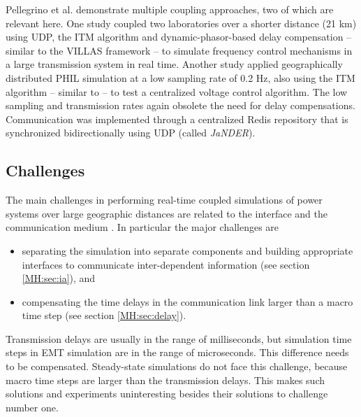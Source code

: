 \documentclass[a4paper]{atseminar}
\begin{document}

Pellegrino et al. \cite{strasser2019, pellegrino2020} demonstrate multiple coupling approaches, two of which are relevant here. One study coupled two laboratories over a shorter distance (21 km) using UDP, the ITM algorithm and dynamic-phasor-based delay compensation -- similar to the VILLAS framework -- to simulate frequency control mechanisms in a large transmission system in real time. Another study applied geographically distributed PHIL simulation at a low sampling rate of 0.2 Hz, also using the ITM algorithm -- similar to \cite{palmintier2015} -- to test a centralized voltage control algorithm. The low sampling and transmission rates again obsolete the need for delay compensations. Communication was implemented through a centralized Redis repository that is synchronized bidirectionally using UDP (called \textit{JaNDER}).

\subsection{Challenges}
\label{MH:sec:challenges}

The main challenges in performing real-time coupled simulations of power systems over large geographic distances are related to the interface and the communication medium \cite{montoya2020}. In particular the major challenges are

\begin{itemize}
    \item separating the simulation into separate components and building appropriate interfaces to communicate inter-dependent information (see section \ref{MH:sec:ia}), and
    \item compensating the time delays in the communication link larger than a macro time step (see section \ref{MH:sec:delay}).
\end{itemize}

Transmission delays are usually in the range of milliseconds, but simulation time steps in EMT simulation are in the range of microseconds. This difference needs to be compensated. Steady-state simulations do not face this challenge, because macro time steps are larger than the transmission delays. This makes such solutions and experiments \cite{palmintier2015, lundstrom2017, pellegrino2020} uninteresting besides their solutions to challenge number one.
\end{document}
